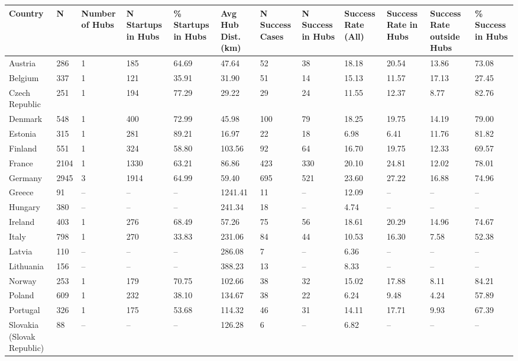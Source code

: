 \begin{tabular}{llllllllllll}
  \toprule
Country & N & Number of Hubs & N Startups in Hubs & \% Startups in Hubs & Avg Hub Dist. (km) & N Success Cases & N Success in Hubs & Success Rate (All) & Success Rate in Hubs & Success Rate outside Hubs & \% Success in Hubs \\ 
  \midrule
Austria & 286 & 1 & 185 & 64.69 & 47.64 & 52 & 38 & 18.18 & 20.54 & 13.86 & 73.08 \\ 
  Belgium & 337 & 1 & 121 & 35.91 & 31.90 & 51 & 14 & 15.13 & 11.57 & 17.13 & 27.45 \\ 
  Czech Republic & 251 & 1 & 194 & 77.29 & 29.22 & 29 & 24 & 11.55 & 12.37 & 8.77 & 82.76 \\ 
  Denmark & 548 & 1 & 400 & 72.99 & 45.98 & 100 & 79 & 18.25 & 19.75 & 14.19 & 79.00 \\ 
  Estonia & 315 & 1 & 281 & 89.21 & 16.97 & 22 & 18 & 6.98 & 6.41 & 11.76 & 81.82 \\ 
  Finland & 551 & 1 & 324 & 58.80 & 103.56 & 92 & 64 & 16.70 & 19.75 & 12.33 & 69.57 \\ 
  France & 2104 & 1 & 1330 & 63.21 & 86.86 & 423 & 330 & 20.10 & 24.81 & 12.02 & 78.01 \\ 
  Germany & 2945 & 3 & 1914 & 64.99 & 59.40 & 695 & 521 & 23.60 & 27.22 & 16.88 & 74.96 \\ 
  Greece & 91 & – & – & – & 1241.41 & 11 & – & 12.09 & – & – & – \\ 
  Hungary & 380 & – & – & – & 241.34 & 18 & – & 4.74 & – & – & – \\ 
  Ireland & 403 & 1 & 276 & 68.49 & 57.26 & 75 & 56 & 18.61 & 20.29 & 14.96 & 74.67 \\ 
  Italy & 798 & 1 & 270 & 33.83 & 231.06 & 84 & 44 & 10.53 & 16.30 & 7.58 & 52.38 \\ 
  Latvia & 110 & – & – & – & 286.08 & 7 & – & 6.36 & – & – & – \\ 
  Lithuania & 156 & – & – & – & 388.23 & 13 & – & 8.33 & – & – & – \\ 
  Norway & 253 & 1 & 179 & 70.75 & 102.66 & 38 & 32 & 15.02 & 17.88 & 8.11 & 84.21 \\ 
  Poland & 609 & 1 & 232 & 38.10 & 134.67 & 38 & 22 & 6.24 & 9.48 & 4.24 & 57.89 \\ 
  Portugal & 326 & 1 & 175 & 53.68 & 114.32 & 46 & 31 & 14.11 & 17.71 & 9.93 & 67.39 \\ 
  Slovakia (Slovak Republic) & 88 & – & – & – & 126.28 & 6 & – & 6.82 & – & – & – \\ 

\end{tabular}

